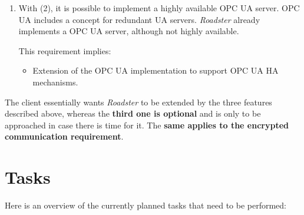 \documentclass[a4paper]{article}
\begin{document}
\begin{enumerate}
\item With (2), it is possible to implement a highly available OPC UA server.
	OPC UA \cite{opc-ua} includes a concept for redundant UA servers.
	\emph{Roadster} already implements a OPC UA server, although not highly
	available.

This requirement implies:

\begin{itemize}
	\item Extension of the OPC UA implementation to support OPC UA HA
		mechanisms.
\end{itemize}
\end{enumerate}

The client essentially wants \emph{Roadster} to be extended by the three
features described above, whereas the \textbf{third one is optional} and is
only to be approached in case there is time for it. The \textbf{same applies
to the encrypted communication requirement}.

\section{Tasks}
Here is an overview of the currently planned tasks that need to be performed:
\end{document}
